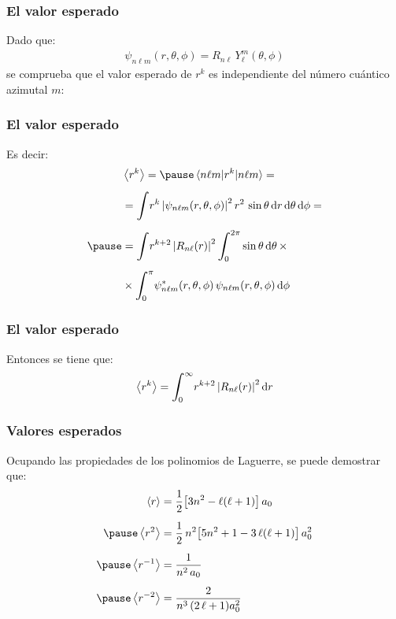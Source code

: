 \documentclass[12pt]{beamer}
\begin{document}
\begin{frame}
\frametitle{El valor esperado}
Dado que:
\pause
\begin{align*}
\psi_{n \ell m} (r, \theta, \phi) = R_{n \ell} \, Y_{\ell}^{m} (\theta, \phi)
\end{align*}
\pause
se comprueba que el valor esperado de $r^{k}$ es independiente del número cuántico azimutal $m$:
\end{frame}
\begin{frame}
\frametitle{El valor esperado}
Es decir:
\pause
\begin{eqnarray*}
\begin{aligned}
&\expval{r^{k}} = \pause \expval{r^{k}}{n \ell m} = \\[0.5em]
&= \scaleint{6ex} r^{k} \, \abs{\psi_{n \ell m} (r, \theta, \phi)}^{2} \, r^{2} \, \sin \theta \dd{r} \dd{\theta} \dd{\phi} = \\[0.5em] \pause
&= \scaleint{6ex} r^{k+2} \, \abs{R_{n \ell} (r) }^ {2} \, \scaleint{6ex}_{\bs 0}^{2 \pi} \sin \theta \dd{\theta} \times \\[0.5em] 
&\times \scaleint{6ex}_{\bs 0}^{\pi} \psi_{n \ell m}^{*} (r, \theta, \phi) \, \psi_{n \ell m} (r, \theta, \phi) \dd{\phi}
\end{aligned}
\end{eqnarray*}
\end{frame}
\begin{frame}
\frametitle{El valor esperado}
Entonces se tiene que:
\pause
\begin{align*}
\expval{r^{k}} = \scaleint{6ex}_{\bs 0}^{\infty} r^{k+2} \, \abs{R_{n \ell} (r)}^{2} \dd{r}
\end{align*}
\end{frame}
\begin{frame}
\frametitle{Valores esperados}
Ocupando las propiedades de los polinomios de Laguerre, se puede demostrar que:
\pause
\begin{eqnarray*}
\begin{aligned}
\expval{r} &= \dfrac{1}{2} \big[ 3 n^{2} - \ell (\ell + 1) \big] \, a_{0} \\[0.5em] \pause
\expval{r^{2}} &= \dfrac{1}{2} \, n^{2} \big[ 5 n^{2} + 1 -  3 \, \ell (\ell + 1) \big] \, a_{0}^{ {2}} \\[0.5em] \pause
\expval{r^{-1}} &= \dfrac{1}{n^{2} \, a_{0}} \\[0.5em] \pause
\expval{r^{-2}} &= \dfrac{2}{n^{3} \, (2 \, \ell + 1) a_{0}^{2}}
\end{aligned}
\end{eqnarray*}
\end{frame}
\end{document}
